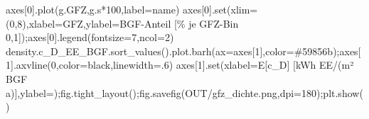 \documentclass[
  ngerman,
  a4paper,
  DIV=11]{scrreprt}
\newenvironment{Shaded}{\begin{snugshade}}{\end{snugshade}}
\newcommand{\BuiltInTok}[1]{\textcolor[rgb]{0.00,0.23,0.31}{#1}}
\newcommand{\DecValTok}[1]{\textcolor[rgb]{0.68,0.00,0.00}{#1}}
\newcommand{\FloatTok}[1]{\textcolor[rgb]{0.68,0.00,0.00}{#1}}
\newcommand{\NormalTok}[1]{\textcolor[rgb]{0.00,0.23,0.31}{#1}}
\newcommand{\OperatorTok}[1]{\textcolor[rgb]{0.37,0.37,0.37}{#1}}
\newcommand{\StringTok}[1]{\textcolor[rgb]{0.13,0.47,0.30}{#1}}
\begin{document}
\begin{Shaded}
\begin{Highlighting}[]
\NormalTok{    axes[}\DecValTok{0}\NormalTok{].plot(g.GFZ,g.s}\OperatorTok{*}\DecValTok{100}\NormalTok{,label}\OperatorTok{=}\NormalTok{name)}
\NormalTok{axes[}\DecValTok{0}\NormalTok{].}\BuiltInTok{set}\NormalTok{(xlim}\OperatorTok{=}\NormalTok{(}\DecValTok{0}\NormalTok{,}\DecValTok{8}\NormalTok{),xlabel}\OperatorTok{=}\StringTok{\textquotesingle{}GFZ\textquotesingle{}}\NormalTok{,ylabel}\OperatorTok{=}\StringTok{\textquotesingle{}BGF{-}Anteil [\% je GFZ{-}Bin 0,1]\textquotesingle{}}\NormalTok{)}\OperatorTok{;}\NormalTok{axes[}\DecValTok{0}\NormalTok{].legend(fontsize}\OperatorTok{=}\DecValTok{7}\NormalTok{,ncol}\OperatorTok{=}\DecValTok{2}\NormalTok{)}
\NormalTok{density.c\_D\_EE\_BGF.sort\_values().plot.barh(ax}\OperatorTok{=}\NormalTok{axes[}\DecValTok{1}\NormalTok{],color}\OperatorTok{=}\StringTok{\textquotesingle{}\#59856b\textquotesingle{}}\NormalTok{)}\OperatorTok{;}\NormalTok{axes[}\DecValTok{1}\NormalTok{].axvline(}\DecValTok{0}\NormalTok{,color}\OperatorTok{=}\StringTok{\textquotesingle{}black\textquotesingle{}}\NormalTok{,linewidth}\OperatorTok{=}\FloatTok{.6}\NormalTok{)}
\NormalTok{axes[}\DecValTok{1}\NormalTok{].}\BuiltInTok{set}\NormalTok{(xlabel}\OperatorTok{=}\StringTok{\textquotesingle{}E[c\_D] [kWh EE/(m² BGF a)]\textquotesingle{}}\NormalTok{,ylabel}\OperatorTok{=}\StringTok{\textquotesingle{}\textquotesingle{}}\NormalTok{)}\OperatorTok{;}\NormalTok{fig.tight\_layout()}\OperatorTok{;}\NormalTok{fig.savefig(OUT}\OperatorTok{/}\StringTok{\textquotesingle{}gfz\_dichte.png\textquotesingle{}}\NormalTok{,dpi}\OperatorTok{=}\DecValTok{180}\NormalTok{)}\OperatorTok{;}\NormalTok{plt.show()}


\end{Highlighting}
\end{Shaded}
\end{document}
